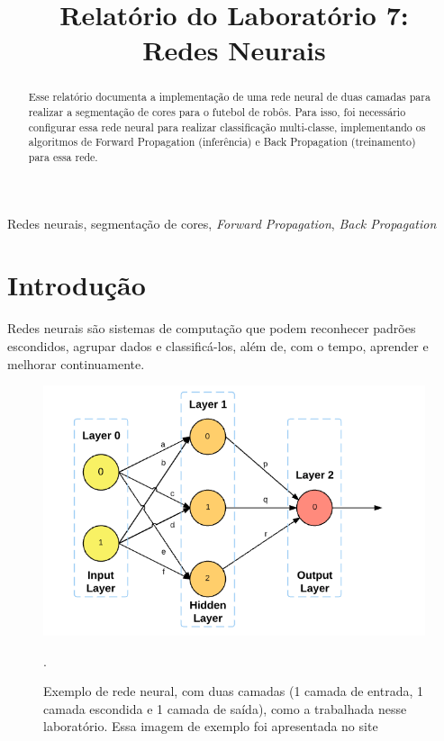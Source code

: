 \documentclass[conference]{IEEEtran}
\begin{document}
\title{Relatório do Laboratório 7: \\ Redes Neurais\\
}

\author{
}

\maketitle

\begin{abstract}
Esse relatório documenta a implementação de uma rede neural de duas camadas para realizar a segmentação de cores para o futebol de robôs. Para isso, foi necessário configurar essa rede neural para realizar classificação multi-classe, implementando os algoritmos de Forward Propagation (inferência) e Back Propagation (treinamento) para essa rede.
\end{abstract}

\begin{IEEEkeywords}
Redes neurais, segmentação de cores, \textit{Forward Propagation}, \textit{Back Propagation}
\end{IEEEkeywords}

\section{Introdução}
Redes neurais são sistemas de computação que podem reconhecer padrões escondidos, agrupar dados e classificá-los, além de, com o tempo, aprender e melhorar continuamente.

\begin{figure}[htbp]
\centering
\centerline{\includegraphics[scale=0.4]{imagens/rede_neural.png}}
\caption{Exemplo de rede neural, com duas camadas (1 camada de entrada, 1 camada escondida e 1 camada de saída), como a trabalhada nesse laboratório. Essa imagem de exemplo foi apresentada no site \cite{b1}}.
\label{translated_sphere/ses}
\end{figure}
\end{document}
